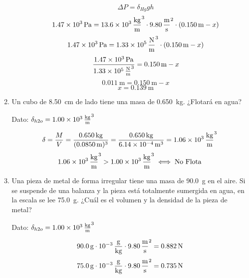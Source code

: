 \documentclass[Análisis.root.tex]{subfiles}
\begin{document}
\begin{enumerate}
\begin{enumerate}
                \[\Delta P=\delta_{Hg}gh\]
                \[\SI{1,47e3}{\pascal}=\SI{13,6e3}{\kilogram\over\meter\cubed}\cdot\SI{9,80}{\meter\over\second\squared}\cdot(\SI{0,150}{\meter}-x)\]
                \[\SI{1,47e3}{\pascal}=\SI{1,33e5}{\newton\over\meter\cubed}\cdot(\SI{0,150}{\meter}-x)\]
                \[\frac{\SI{1,47e3}{\pascal}}{\SI{1,33e5}{\newton\over\meter\cubed}}=\SI{0,150}{\meter}-x\]
                \[\SI{0,011}{\meter}=\SI{0,150}{\meter}-x\]
                \[x=\boxed{\SI{0,139}{\meter}}\]
        \end{enumerate}

  \item Un cubo de \SI{8,50}{\cm} de lado tiene una masa de \SI{0,650}{\kilogram}. ¿Flotará en agua?

        Dato: $\delta_{h2o}=\SI{1,00e3}{\kilogram\over\meter\cubed}$

        \[
          \delta=\frac{M}{V}
          =\frac{\SI{0,650}{\kilogram}}{(\SI{0,0850}{\meter})^3}
          =\frac{\SI{0,650}{\kilogram}}{\SI{6,14e-4}{\meter\cubed}}
          =\SI{1,06e3}{\kilogram\over\meter\cubed}
        \]
        \[\SI{1,06e3}{\kilogram\over\meter\cubed}>\SI{1,00e3}{\kilogram\over\meter\cubed}\iff\text{No Flota}\]

        \newpage

  \item Una pieza de metal de forma irregular tiene una masa de \SI{90,0}{\gram} en el aire. Si se suspende de una balanza y la pieza está totalmente sumergida en agua, en la escala se lee \SI{75,0}{\gram}. ¿Cuál es el volumen y la densidad de la pieza de metal?

        Dato: $\delta_{h2o}=\SI{1,00e3}{\kilogram\over\meter\cubed}$

        \begin{multicols}{2}
          \begin{center}
          \end{center}

          \[\SI{90,0}{\gram}\cdot\SI{e-3}{\gram\over\kilogram}\cdot\SI{9,80}{\meter\over\second\squared}=\SI{0,882}{\newton}\]
          \[\SI{75,0}{\gram}\cdot\SI{e-3}{\gram\over\kilogram}\cdot\SI{9,80}{\meter\over\second\squared}=\SI{0,735}{\newton}\]


\end{multicols}
\end{enumerate}
\end{document}
